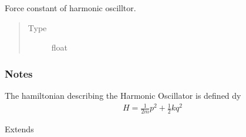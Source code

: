 \documentclass[a4paper,landscape,10pt,english]{sphinxmanual}
\begin{document}
\begin{fulllineitems}
\begin{fulllineitems}
\label{\detokenize{code_docs/simulation_API.simulation:simulation_API.simulation.simulations.HarmonicOsc1D.k}}
Force constant of harmonic oscilltor.
\begin{quote}\begin{description}
\item[{Type}] \leavevmode
float

\end{description}\end{quote}

\end{fulllineitems}

\subsubsection*{Notes}

The hamiltonian describing the Harmonic Oscillator is defined dy
\begin{equation*}
\begin{split}H = \frac{1}{2m}p^2 + \frac{1}{2}k q^2\end{split}
\end{equation*}

\begin{fulllineitems}
\label{\detokenize{code_docs/simulation_API.simulation:simulation_API.simulation.simulations.HarmonicOsc1D.__init__}}
Extends {\hyperref[\detokenize{code_docs/simulation_API.simulation:simulation_API.simulation.simulations.Simulation.__init__}]{}}


\end{fulllineitems}
\end{fulllineitems}
\end{document}

